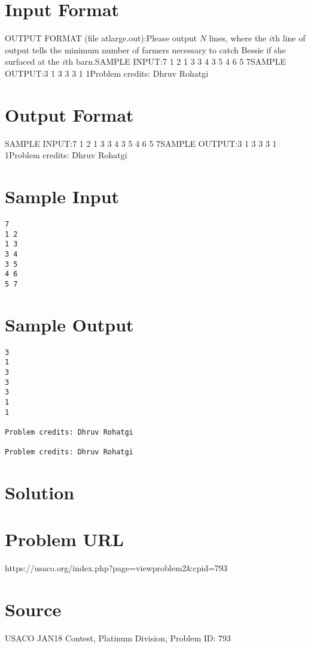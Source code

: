 \documentclass[12pt]{article}
\begin{document}
\section*{Input Format}
OUTPUT FORMAT (file atlarge.out):Please output $N$ lines, where the $i$th line of output tells the minimum number
of farmers necessary to catch Bessie if she surfaced at the $i$th barn.SAMPLE INPUT:7
1 2
1 3
3 4
3 5
4 6
5 7SAMPLE OUTPUT:3
1
3
3
3
1
1Problem credits: Dhruv Rohatgi

\section*{Output Format}
SAMPLE INPUT:7
1 2
1 3
3 4
3 5
4 6
5 7SAMPLE OUTPUT:3
1
3
3
3
1
1Problem credits: Dhruv Rohatgi

\section*{Sample Input}
\begin{verbatim}
7
1 2
1 3
3 4
3 5
4 6
5 7
\end{verbatim}

\section*{Sample Output}
\begin{verbatim}
3
1
3
3
3
1
1

Problem credits: Dhruv Rohatgi

Problem credits: Dhruv Rohatgi
\end{verbatim}

\section*{Solution}


\section*{Problem URL}
https://usaco.org/index.php?page=viewproblem2&cpid=793

\section*{Source}
USACO JAN18 Contest, Platinum Division, Problem ID: 793
\end{document}
